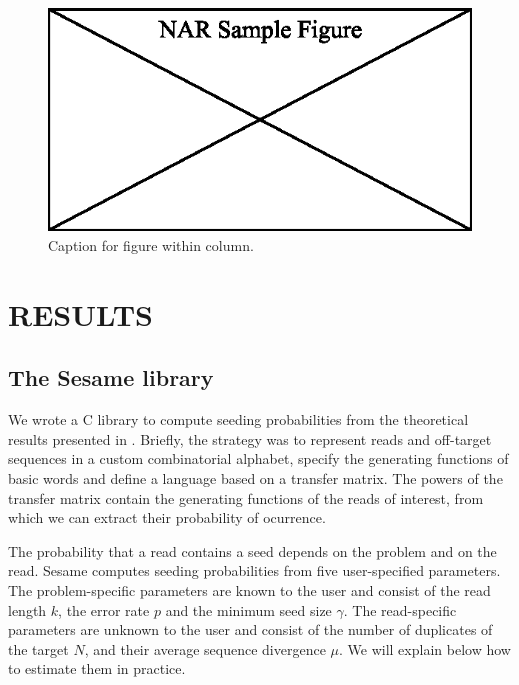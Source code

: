 \documentclass[a4,center,fleqn]{NAR}
\begin{document}
\begin{figure}[t]
\begin{center}
\includegraphics{NAR-fig1.eps}
\end{center}
\caption{Caption for figure within column.}
\label{NAR-fig1}
\end{figure}


\section{RESULTS}

\subsection{The Sesame library}


We wrote a C library to compute seeding probabilities from the theoretical
results presented in \cite{1}. Briefly, the strategy was to represent
reads and off-target sequences in a custom combinatorial alphabet, specify
the generating functions of basic words and define a language based on a
transfer matrix. The powers of the transfer matrix contain the generating
functions of the reads of interest, from which we can extract their
probability of ocurrence.

The probability that a read contains a seed depends on the problem and on
the read. Sesame computes seeding probabilities from five user-specified
parameters. The problem-specific parameters are known to the user and
consist of the read length $k$, the error rate $p$ and the minimum seed
size $\gamma$. The read-specific parameters are unknown to the user and
consist of the number of duplicates of the target $N$, and their average
sequence divergence $\mu$. We will explain below how to estimate them in
practice.
\end{document}
